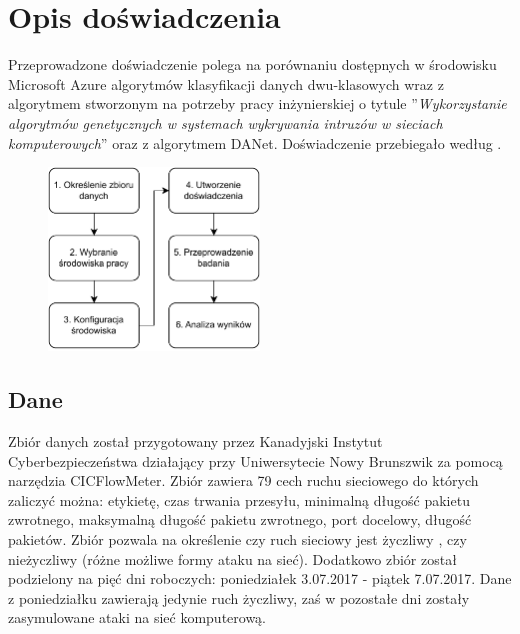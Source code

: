 \chapter{Opis doświadczenia}
Przeprowadzone doświadczenie polega na porównaniu dostępnych w środowisku Microsoft Azure algorytmów klasyfikacji danych dwu-klasowych wraz z algorytmem stworzonym na potrzeby pracy inżynierskiej o tytule ''\textit{Wykorzystanie algorytmów genetycznych w systemach wykrywania intruzów w sieciach komputerowych}''\cite{Blyszcz2022} oraz z algorytmem DANet\cite{Chen2022}. Doświadczenie przebiegało według .

\begin{figure}[H]
    \centering
    \includegraphics[width=0.5\textwidth]{images/schemat_pracy}
    \label{fig:sch-prac}
\end{figure}

\section{Dane}
Zbiór danych został przygotowany przez Kanadyjski Instytut Cyberbezpieczeństwa działający przy Uniwersytecie Nowy Brunszwik za pomocą narzędzia CICFlowMeter\cite{Ahlashkari2022}. Zbiór zawiera 79 cech ruchu sieciowego do których zaliczyć można: etykietę, czas trwania przesyłu, minimalną długość pakietu zwrotnego, maksymalną długość pakietu zwrotnego, port docelowy, długość pakietów. Zbiór pozwala na określenie czy ruch sieciowy jest życzliwy , czy nieżyczliwy (różne możliwe formy ataku na sieć). Dodatkowo zbiór został podzielony na pięć dni roboczych: poniedziałek 3.07.2017 - piątek 7.07.2017. Dane z poniedziałku zawierają jedynie ruch życzliwy, zaś w pozostałe dni zostały zasymulowane ataki na sieć komputerową\cite{Blyszcz2022, unbkaggle}.

